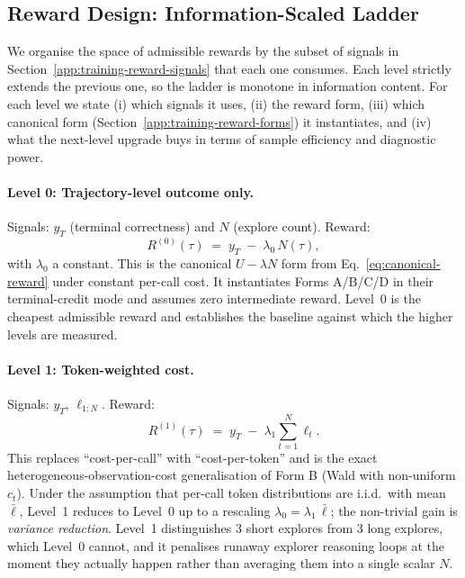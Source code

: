 \subsection{Reward Design: Information-Scaled Ladder}
\label{app:training-reward-ladder}

We organise the space of admissible rewards by the subset of signals in Section~\ref{app:training-reward-signals} that each one consumes. Each level strictly extends the previous one, so the ladder is monotone in information content. For each level we state (i) which signals it uses, (ii) the reward form, (iii) which canonical form (Section~\ref{app:training-reward-forms}) it instantiates, and (iv) what the next-level upgrade buys in terms of sample efficiency and diagnostic power.

\paragraph{Level 0: Trajectory-level outcome only.}
Signals: $y_T$ (terminal correctness) and $N$ (explore count). Reward:
\begin{equation}
R^{(0)}(\tau) \;=\; y_T \;-\; \lambda_0\,N(\tau),
\label{eq:reward-level0}
\end{equation}
with $\lambda_0$ a constant. This is the canonical $U - \lambda N$ form from Eq.~\eqref{eq:canonical-reward} under constant per-call cost. It instantiates Forms A/B/C/D in their terminal-credit mode and assumes zero intermediate reward. Level~0 is the cheapest admissible reward and establishes the baseline against which the higher levels are measured.

\paragraph{Level 1: Token-weighted cost.}
Signals: $y_T$, $\ell_{1:N}$. Reward:
\begin{equation}
R^{(1)}(\tau) \;=\; y_T \;-\; \lambda_1 \sum_{t=1}^{N} \ell_t.
\label{eq:reward-level1}
\end{equation}
This replaces ``cost-per-call'' with ``cost-per-token'' and is the exact heterogeneous-observation-cost generalisation of Form B (Wald with non-uniform $c_t$). Under the assumption that per-call token distributions are i.i.d.\ with mean $\bar\ell$, Level~1 reduces to Level~0 up to a rescaling $\lambda_0 = \lambda_1\,\bar\ell$; the non-trivial gain is \emph{variance reduction}. Level~1 distinguishes $3$ short explores from $3$ long explores, which Level~0 cannot, and it penalises runaway explorer reasoning loops at the moment they actually happen rather than averaging them into a single scalar $N$.

